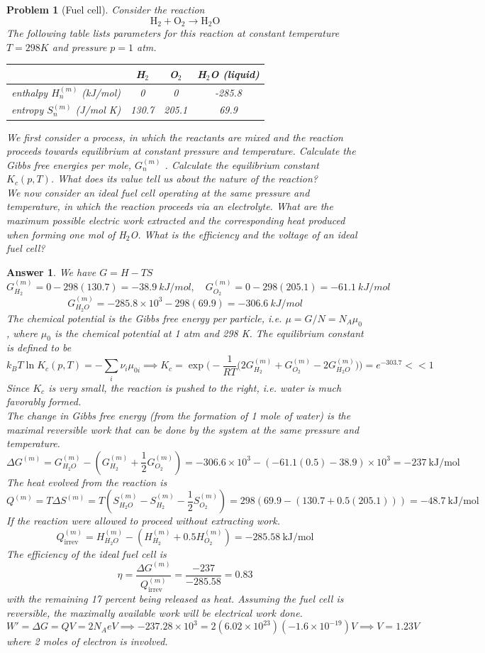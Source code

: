 \documentclass[a4paper]{article}
\newtheorem{ans}{Answer}[section]
\theoremstyle{new}
\newtheorem{qns}{Problem}[section]
\begin{document}
\newpage
\begin{qns}[Fuel cell]
Consider the reaction
$$\text{H}_2+\text{O}_2\rightarrow\text{H}_2\text{O}$$
The following table lists parameters for this reaction at constant temperature $T = 298 K$ and pressure $p = 1$ atm.
\begin{center}
\begin{tabular}{|c|c|c|c|}
\hline
         & H$_2$    & O$_2$    & H$_2$O (liquid)      \\
         \hline
enthalpy $H_n^{(m)}$ (kJ/mol) & 0     & 0     & -285.8   \\
\hline
entropy $S_n^{(m)}$ (J/mol K) & 130.7 & 205.1 & 69.9    \\
\hline
\end{tabular}
\end{center}
We first consider a process, in which the reactants are mixed and the reaction proceeds towards equilibrium at constant pressure and temperature. Calculate the Gibbs free energies per mole, $G_n^{(m)}$ . Calculate the equilibrium constant $K_c(p,T)$. What does its value tell us about the nature of the reaction?\\[5pt]
We now consider an ideal fuel cell operating at the same pressure and temperature, in which the reaction proceeds via an electrolyte. What are the maximum possible electric work extracted and the corresponding heat produced when forming one mol of H$_2$O. What is the efficiency and the voltage of an ideal fuel cell?
\end{qns}
\begin{ans}
We have $G=H-TS$
$$G_{H_2}^{(m)}=0-298(130.7)=-38.9~kJ/mol,\quad G_{O_2}^{(m)}=0-298(205.1)=-61.1~kJ/mol$$
$$G_{H_2O}^{(m)}=-285.8\times10^3-298(69.9)=-306.6~kJ/mol$$
The chemical potential is the Gibbs free energy per particle, i.e. $\mu=G/N=N_A\mu_0$, where $\mu_0$ is the chemical potential at 1 atm and 298 K. The equilibrium constant is defined to be
$$k_BT\ln K_c(p,T)=-\sum_i\nu_i\mu_{0i}\implies K_c=\exp\bigg(-\frac{1}{RT}\bigg(2G_{H_2}^{(m)}+G_{O_2}^{(m)}-2G_{H_2O}^{(m)}\bigg)\bigg)=e^{-303.7}<<1$$
Since $K_c$ is very small, the reaction is pushed to the right, i.e. water is much favorably formed.\\[5pt]
The change in Gibbs free energy (from the formation of 1 mole of water) is the maximal reversible work that can be done by the system at the same pressure and temperature. 
$$\Delta G^{(m)}=G^{(m)}_{H_2O}-(G_{H_2}^{(m)}+\frac{1}{2}G_{O_2}^{(m)})=-306.6\times10^3-(-61.1(0.5)-38.9)\times10^3=-237~\text{kJ/mol}$$
The heat evolved from the reaction is
$$Q^{(m)}=T\Delta S^{(m)}=T(S_{H_2O}^{(m)}-S_{H_2}^{(m)}-\frac{1}{2}S_{O_2}^{(m)})=298(69.9-(130.7+0.5(205.1)))=-48.7~\text{kJ/mol}$$
If the reaction were allowed to proceed without extracting work. 
$$Q_{\text{irrev}}^{(m)}=H_{H_2O}^{(m)}-(H_{H_2}^{(m)}+0.5H_{O_2}^{(m)})=-285.58~\text{kJ/mol}$$
The efficiency of the ideal fuel cell is
$$\eta=\frac{\Delta G^{(m)}}{Q_{\text{irrev}}^{(m)}}=\frac{-237}{-285.58}=0.83$$
with the remaining 17 percent being released as heat. Assuming the fuel cell is reversible, the maximally available work will be electrical work done.
$$W'=\Delta G=QV=2N_AeV\implies-237.28\times10^3=2(6.02\times10^{23})(-1.6\times10^{-19})V\implies V=1.23V$$
where 2 moles of electron is involved.
\end{ans}
\end{document}
